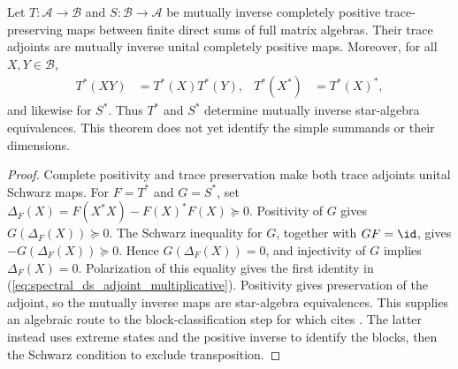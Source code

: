 \begin{theorem}%
    \label{thm:direct_sum_inverse_cptp_star_equiv}
    \leanok
     Let $T:\mathcal A\to\mathcal B$ and $S:\mathcal B\to\mathcal A$ be
    mutually inverse completely positive trace-preserving maps between finite direct sums of full matrix algebras. Their trace adjoints are mutually
    inverse unital completely positive maps. Moreover, for all $X,Y\in\mathcal B$,
    \begin{align}
        T^*(XY)
         & =T^*(X)T^*(Y),
         &
        T^*(X^*)
         & =T^*(X)^*,
        \label{eq:spectral_ds_adjoint_multiplicative}
    \end{align}
    and likewise for $S^*$. Thus $T^*$ and $S^*$ determine mutually inverse star-algebra equivalences. This theorem does not yet identify the simple
    summands or their dimensions.
\end{theorem}

\begin{proof}\leanok
    Complete positivity and trace preservation make both trace adjoints unital Schwarz maps. For $F=T^*$ and $G=S^*$, set
    $\Delta_F(X)=F(X^*X)-F(X)^*F(X)\succeq0$. Positivity of $G$ gives $G(\Delta_F(X))\succeq0$. The Schwarz inequality
    for $G$, together with $GF=\id$, gives $-G(\Delta_F(X))\succeq0$. Hence $G(\Delta_F(X))=0$, and injectivity of
    $G$ implies $\Delta_F(X)=0$. Polarization of this equality gives the
    first identity in (\ref{eq:spectral_ds_adjoint_multiplicative}).
    Positivity gives preservation of the adjoint, so the mutually inverse
    maps are star-algebra equivalences. This supplies an algebraic route to
    the block-classification step for which
    \cite[Appendix~C.4, line~1997]{Cirac2016MPDO_arXiv} cites
    \cite[Theorem~8]{WolfPerezGarcia2010Inverse}. The latter instead uses
    extreme states and the positive inverse to identify the blocks, then the
    Schwarz condition to exclude transposition.
\end{proof}

